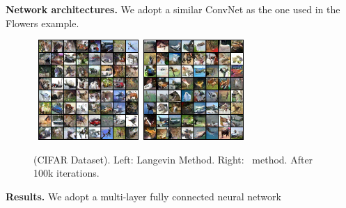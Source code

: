 \documentclass[10pt,twocolumn,letterpaper]{article}
\begin{document}
\medskip
\textbf{Network architectures.} 
We adopt a similar ConvNet as the one used in the Flowers example.



\begin{figure}[H]
\begin{center}
    \mbox{
        \includegraphics[width=1.5in]{figs/cifarlangevin}
        \includegraphics[width=1.5in]{figs/cifaranila}
        }
\end{center}
\caption{(CIFAR Dataset). Left: Langevin Method. Right: \algo\ method. After 100k iterations.}
	\label{fig:cifar}
\end{figure}

\medskip
\textbf{Results.} We adopt a multi-layer fully connected neural network

\end{document}

